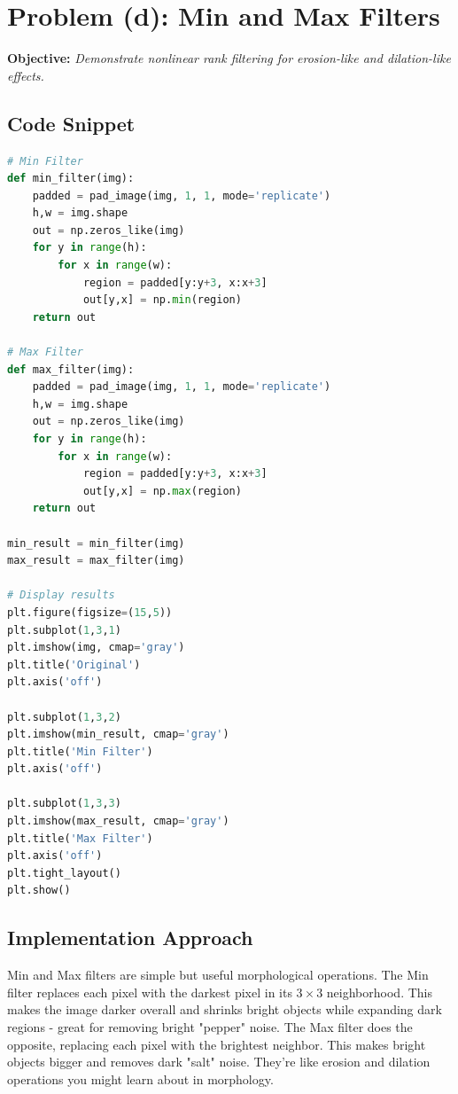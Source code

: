 \documentclass[12pt,a4paper]{report}
\begin{document}
\section{Problem (d): Min and Max Filters}
\textbf{Objective:} \textit{Demonstrate nonlinear rank filtering for erosion-like and dilation-like effects.}

\subsection{Code Snippet}
\begin{lstlisting}[language=Python, caption={Min and Max Filters}]
# Min Filter
def min_filter(img):
    padded = pad_image(img, 1, 1, mode='replicate')
    h,w = img.shape
    out = np.zeros_like(img)
    for y in range(h):
        for x in range(w):
            region = padded[y:y+3, x:x+3]
            out[y,x] = np.min(region)
    return out

# Max Filter
def max_filter(img):
    padded = pad_image(img, 1, 1, mode='replicate')
    h,w = img.shape
    out = np.zeros_like(img)
    for y in range(h):
        for x in range(w):
            region = padded[y:y+3, x:x+3]
            out[y,x] = np.max(region)
    return out

min_result = min_filter(img)
max_result = max_filter(img)

# Display results
plt.figure(figsize=(15,5))
plt.subplot(1,3,1)
plt.imshow(img, cmap='gray')
plt.title('Original')
plt.axis('off')

plt.subplot(1,3,2)
plt.imshow(min_result, cmap='gray')
plt.title('Min Filter')
plt.axis('off')

plt.subplot(1,3,3)
plt.imshow(max_result, cmap='gray')
plt.title('Max Filter')
plt.axis('off')
plt.tight_layout()
plt.show()
\end{lstlisting}

\subsection{Implementation Approach}
Min and Max filters are simple but useful morphological operations. The Min filter replaces each pixel with the darkest pixel in its \(3\times 3\) neighborhood. This makes the image darker overall and shrinks bright objects while expanding dark regions - great for removing bright "pepper" noise. The Max filter does the opposite, replacing each pixel with the brightest neighbor. This makes bright objects bigger and removes dark "salt" noise. They're like erosion and dilation operations you might learn about in morphology.
\end{document}
